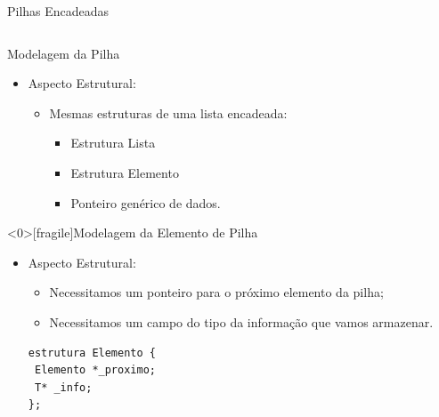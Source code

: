\documentclass[12pt,table,xcolor={dvipsnames}]{beamer}
\begin{document}
\begin{frame}[fragile]{Pilhas Encadeadas}
\begin{columns}
\begin{center}
\end{center}
\end{columns}
\end{frame}

\begin{frame}[fragile]{Modelagem da Pilha}

\begin{itemize}
\item Aspecto Estrutural:
\begin{itemize}
\item Mesmas estruturas de uma lista encadeada:
\begin{itemize}
\item Estrutura Lista
\item Estrutura Elemento
\item Ponteiro genérico de dados.
\end{itemize}
\end{itemize}
\end{itemize}
\end{frame}


\begin{frame}<0>[fragile]{Modelagem da Elemento de Pilha}

\begin{itemize}
\item Aspecto Estrutural:
\begin{itemize}
\item Necessitamos um ponteiro para o próximo elemento da pilha;
\item Necessitamos um campo do tipo da informação que vamos armazenar.
\end{itemize}
\begin{lstlisting}
estrutura Elemento {
 Elemento *_proximo;
 T* _info;
};
\end{lstlisting}
\end{itemize}
\end{frame}
\end{document}
